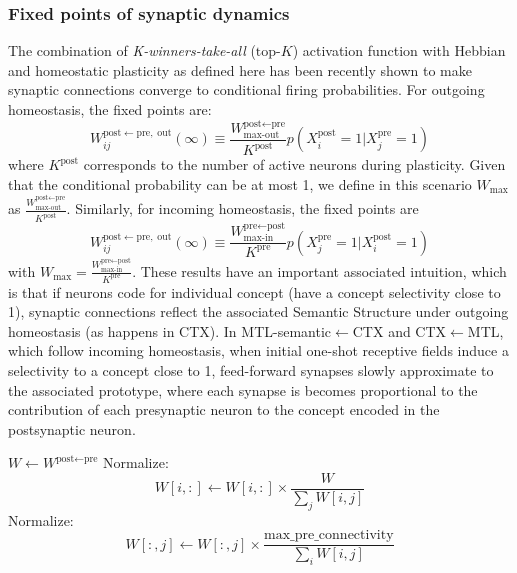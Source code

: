 \documentclass{article}
\begin{document}
\subsubsection*{Fixed points of synaptic dynamics}
The combination of \textit{K-winners-take-all} ($\textrm{top-}K$) activation function with Hebbian and homeostatic plasticity as defined here has been recently shown  to make synaptic connections converge to conditional firing probabilities. For outgoing homeostasis, the fixed points are:
  \begin{equation}
     W_{ij}^{\textrm{post}\leftarrow\textrm{pre}, \; \textrm{out}}(\infty) \equiv \frac{W_\textrm{max-out}^{\textrm{post}\leftarrow\textrm{pre}}}{K^\textrm{post}}p(X^\textrm{post}_i = 1| X^\textrm{pre}_j = 1)
 \end{equation}
 where $K^\textrm{post}$ corresponds to the number of active neurons during plasticity. Given that the conditional probability can be at most 1, we define in this scenario $W_\textrm{max}$ as $\frac{W_\textrm{max-out}^{\textrm{post}\leftarrow\textrm{pre}}}{K^\textrm{post}}$. Similarly, for incoming homeostasis, the fixed points are
   \begin{equation}
   W_{ij}^{\textrm{post}\leftarrow\textrm{pre}, \; \textrm{out}}(\infty) \equiv \frac{W_\textrm{max-in}^{\textrm{pre}\leftarrow\textrm{post}}}{K^\textrm{pre}}p(X^\textrm{pre}_j = 1| X^\textrm{post}_i = 1)
 \end{equation}
 with $W_\textrm{max}=\frac{W_\textrm{max-in}^{\textrm{pre}\leftarrow\textrm{post}}}{K^\textrm{pre}}$. These results have an important associated intuition, which is that if neurons code for individual concept (have a concept selectivity close to 1), synaptic connections reflect the associated Semantic Structure  under outgoing homeostasis (as happens in CTX). In MTL-semantic$\leftarrow$CTX and CTX$\leftarrow$MTL, which follow incoming homeostasis, when initial one-shot receptive fields induce a selectivity to a concept close to 1, feed-forward synapses slowly approximate to the associated prototype, where each synapse is becomes proportional to the contribution of each presynaptic neuron to the concept encoded in the postsynaptic neuron.
\begin{algorithm}
\caption{Homeostasis}\label{alg:homeostasis}
\begin{algorithmic}[1]
\State $W \gets W^{\textrm{post}\leftarrow\textrm{pre}}$
            \State Normalize:
                \[
                W[i,:] \gets W[i,:] 
                \times
                \frac{W^\textrm{}}{\sum_j W[i,j]}
                \]
        \EndIf
    \EndFor
            \State Normalize:
                \[
                W[:,j] \gets W[:,j] 
                \times
                \frac{\text{max\_pre\_connectivity}}{\sum_i W[i,j]}
                \]
        \EndIf
    \EndFor
\EndFunction
\end{algorithmic}
\end{algorithm}
\end{document}
